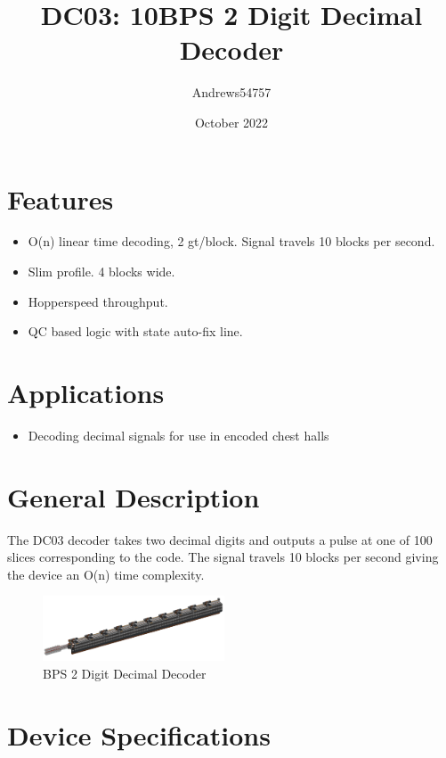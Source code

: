 \documentclass[10pt]{datasheet}
\title{DC03: 10BPS 2 Digit Decimal Decoder}
\author{Andrews54757}
\date{October 2022}
\begin{document}
\maketitle

\section{Features}

\begin{itemize}
\item{O(n) linear time decoding, 2 gt/block. Signal travels 10 blocks per second.}
\item{Slim profile. 4 blocks wide.}
\item{Hopperspeed throughput.}
\item{QC based logic with state auto-fix line.}
\end{itemize}

\section{Applications}

\begin{itemize}
\item{Decoding decimal signals for use in encoded chest halls}
\end{itemize}

\section{General Description}
The DC03 decoder takes two decimal digits and outputs a pulse at one of 100 slices corresponding to the code. The signal travels 10 blocks per second giving the device an O(n) time complexity.
\vfill\break

\begin{figure}[h]
    \centering
    \includegraphics[width=0.48\textwidth]{bps.png}
    \caption{ BPS 2 Digit Decimal Decoder}
\end{figure}

\onecolumn

\section{Device Specifications}
\end{document}
